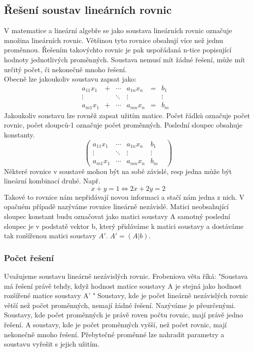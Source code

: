 \documentclass[10pt,a4paper]{article}
\begin{document}
\subsection{Řešení soustav lineárních rovnic}
V matematice a lineární algebře se jako soustava lineárních rovnic označuje množina lineárních rovnic. Většinou tyto rovnice obsahují více než jednu proměnnou. Řešením takovýchto rovnic je pak uspořádaná n-tice popisující hodnoty jednotlivých proměnných. Soustava nemusí mít žádné řešení, může mít určitý počet, či nekonečně mnoho řešení. \\
Obecně lze jakoukoliv soustavu zapsat jako:
\[\begin{matrix} a_{11}x_{1} & + & \cdots & a_{1n}x_{n} & = & b_1 & \\ \vdots & & \ddots & \vdots & & \vdots & \\ a_{m1}x_{1} & + & \cdots & a_{mn}x_{n} & = & b_m & \end{matrix}\]
Jakoukoliv soustavu lze rovněž zapsat užitím matice. Počet řádků označuje počet rovnic, počet sloupců-1 označuje počet proměnných. Poslední sloupec obsahuje konstanty.
\[\begin{pmatrix} a_{11}x_{1} & \cdots & a_{1n}x_{n} & b_1 & \\ \vdots & \ddots & \vdots & \vdots & \\ a_{m1}x_{1} & \cdots & a_{mn}x_{n} & b_m & \end{pmatrix}\]
Některé rovnice v soustavě mohou být na sobě závislé, resp jedna může být lineární kombinací druhé. Např. 
\[x + y = 1 \Leftrightarrow 2x + 2y = 2\]
Takové to rovnice nám nepřidávají novou informaci a stačí nám jedna z nich. V opačném případě nazýváme rovnice lineárně nezávislé.
Matici neobsahující sloupec konstant budu označovat jako matici soustavy A samotný poslední sloupec je v podstatě vektor b, který přidáváme k matici soustavy a dostáváme tak rozšířenou matici soustavy $A'$. $A' = (A|b)$.
\subsubsection{Počet řešení}
Uvažujeme soustavu lineárně nezávislých rovnic.
Frobeniova věta říká: "Soustava má řešení právě tehdy, když hodnost matice soustavy A je stejná jako hodnost rozšířené matice soustavy A' "
Soustavy, kde je počet lineárně nezávislých rovnic větší než počet proměnných, nemají žádné řešení. Nazýváme je přeurčenými.
Soustavy, kde počet proměnných je právě roven počtu rovnic, mají právě jedno řešení.
A soustavy, kde je počet proměnných vyšší, než počet rovnic, mají nekonečně mnoho řešení. Přebytečné proměnné lze nahradit parametry a soustavu vyřešit s jejich užitím.
\end{document}
